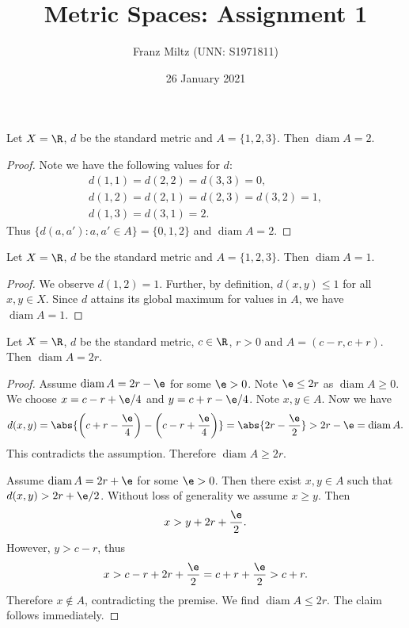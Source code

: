 \documentclass{article}
\DeclareMathOperator{\diam}{diam}
\begin{document}
\title{Metric Spaces: Assignment 1}
\author{Franz Miltz (UNN: S1971811)}
\date{26 January 2021}
\maketitle

\begin{claim*}[1a]
   Let $X=\R$, $d$ be the standard metric and $A=\{1,2,3\}$. Then $\diam A = 2$.
   \begin{proof}
      Note we have the following values for $d$:
      \begin{align*}
         d(1,1) = d(2,2) = d(3,3) = 0,\\
         d(1,2) = d(2,1) = d(2,3) = d(3,2) = 1,\\
         d(1,3) = d(3,1) = 2.
      \end{align*} 
      Thus $\{d(a,a'):a,a'\in A\}=\{0,1,2\}$ and $\diam A = 2$.
   \end{proof}
\end{claim*}

\begin{claim*}[1b]
   Let $X=\R$, $d$ be the standard metric and $A=\{1,2,3\}$. Then $\diam A=1$. 
   \begin{proof}
      We observe $d(1,2)=1$. Further, by definition, $d(x,y)\leq 1$ for all $x,y\in X$. 
      Since $d$ attains its global maximum for values in $A$, we have $\diam A=1$.
   \end{proof}
\end{claim*}

\begin{claim*}[2]
   Let $X=\R$, $d$ be the standard metric, $c\in\R$, $r>0$ and $A=(c-r,c+r)$. Then 
   $\diam A = 2r$.
   \begin{proof}
      Assume $\diam A = 2r-\e$ for some $\e>0$. Note $\e\leq 2r$ as $\diam A \geq 0$. 
      We choose $x=c-r+\e/4$ and $y=c+r-\e/4$. Note $x,y\in A$. Now we have 
      \begin{align*}
         d(x,y) = \abs{\left(c+r-\frac{\e}{4}\right)-\left(c-r+\frac{\e}{4}\right)}
         = \abs{2r-\frac{\e}{2}} > 2r - \e = \diam A.
      \end{align*}
      This contradicts the assumption. Therefore $\diam A \geq 2r$.

      Assume $\diam A = 2r+\e$ for some $\e>0$. Then there exist $x,y\in A$ such that 
      $d(x,y) > 2r+\e/2$. Without loss of generality we assume $x\geq y$. Then 
      \begin{align*}
          x > y + 2r + \frac{\e}{2}.
      \end{align*}
      However, $y > c - r$, thus 
      \begin{align*}
         x > c - r + 2r + \frac{\e}{2} = c + r + \frac{\e}{2} > c + r.
      \end{align*}
      Therefore $x\not\in A$, contradicting the premise. We find $\diam A \leq 2r$. 
      The claim follows immediately.
   \end{proof}
\end{claim*}
\end{document}

